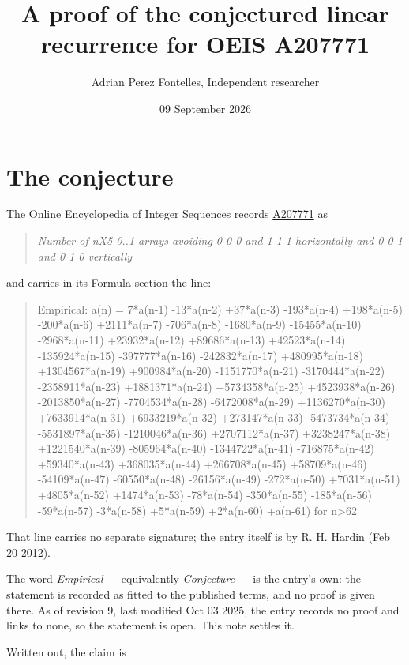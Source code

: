 \documentclass[11pt]{article}
\title{A proof of the conjectured linear recurrence for OEIS A207771}
\author{Adrian Perez Fontelles, Independent researcher}
\date{09 September 2026}
\theoremstyle{definition}
\begin{document}
\maketitle
\section{The conjecture}

The Online Encyclopedia of Integer Sequences records \href{https://oeis.org/A207771}{A207771} as

\begin{quote}\itshape Number of nX5 0..1 arrays avoiding 0 0 0 and 1 1 1 horizontally and 0 0 1 and 0 1 0 vertically\end{quote}

and carries in its Formula section the line:

\begin{quote}\ttfamily Empirical: a(n) = 7*a(n-1) -13*a(n-2) +37*a(n-3) -193*a(n-4) +198*a(n-5) -200*a(n-6) +2111*a(n-7) -706*a(n-8) -1680*a(n-9) -15455*a(n-10) -2968*a(n-11) +23932*a(n-12) +89686*a(n-13) +42523*a(n-14) -135924*a(n-15) -397777*a(n-16) -242832*a(n-17) +480995*a(n-18) +1304567*a(n-19) +900984*a(n-20) -1151770*a(n-21) -3170444*a(n-22) -2358911*a(n-23) +1881371*a(n-24) +5734358*a(n-25) +4523938*a(n-26) -2013850*a(n-27) -7704534*a(n-28) -6472008*a(n-29) +1136270*a(n-30) +7633914*a(n-31) +6933219*a(n-32) +273147*a(n-33) -5473734*a(n-34) -5531897*a(n-35) -1210046*a(n-36) +2707112*a(n-37) +3238247*a(n-38) +1221540*a(n-39) -805964*a(n-40) -1344722*a(n-41) -716875*a(n-42) +59340*a(n-43) +368035*a(n-44) +266708*a(n-45) +58709*a(n-46) -54109*a(n-47) -60550*a(n-48) -26156*a(n-49) -272*a(n-50) +7031*a(n-51) +4805*a(n-52) +1474*a(n-53) -78*a(n-54) -350*a(n-55) -185*a(n-56) -59*a(n-57) -3*a(n-58) +5*a(n-59) +2*a(n-60) +a(n-61) for n>62\end{quote}

That line carries no separate signature; the entry itself is by R. H. Hardin (Feb 20 2012).

The word {\itshape Empirical} --- equivalently {\itshape Conjecture} --- is the entry's own: the statement is recorded as fitted to the published terms, and no proof is given there. As of revision 9, last modified Oct 03 2025, the entry records no proof and links to none, so the statement is open. This note settles it.

Written out, the claim is
\end{document}
